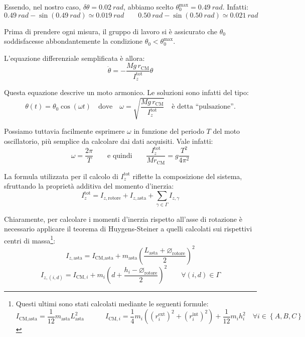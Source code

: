 \documentclass{article}
\newcommand*{\diam}{\varnothing}
\begin{document}
Essendo, nel nostro caso, $\delta\theta=\qty{0.02}{rad}$, abbiamo scelto
$\theta_0^\text{max} = \qty{0.49}{rad}$. Infatti:
\[
  \qty{0.49}{rad} - \sin(\qty{0.49}{rad}) \simeq \qty{0.019}{rad}
  \qquad
  \qty{0.50}{rad} - \sin(\qty{0.50}{rad}) \simeq \qty{0.021}{rad}
\]

Prima di prendere ogni misura, il gruppo di lavoro si è assicurato
che $\theta_0$ soddisfacesse abbondantemente la condizione
$\theta_0<\theta_0^\text{max}$.

L'equazione differenziale semplificata è allora:
\[ \ddot{\theta} = -\frac{Mg\,r_\text{CM}}{I_z^\text{tot}} \theta \]

Questa equazione descrive un moto armonico. Le soluzioni sono infatti
del tipo:
\[
  \theta(t) = \theta_0\cos(\omega t)
  \quad\text{dove}\quad
  \omega = \sqrt{\frac{Mg\,r_\text{CM}}{I_z^\text{tot}}}\quad\text{è detta “pulsazione”}.
\]

Possiamo tuttavia facilmente esprimere $\omega$ in funzione del periodo
$T$ del moto oscillatorio, più semplice da calcolare dai dati acquisiti.
Vale infatti:
\[
  \omega = \frac{2\pi}{T}
  \qquad\text{e quindi}\qquad
  \frac{I_z^\text{tot}}{Mr_\text{CM}} = g \frac{T^2}{4\pi^2}
\]

La formula utilizzata per il calcolo di $I_z^\text{tot}$ riflette la composizione
del sistema, sfruttando la proprietà additiva del momento d'inerzia:
\[I_z^\text{tot} = I_{z,\text{rotore}} + I_{z,\text{asta}} + \sum_{\gamma\in\Gamma} I_{z,\gamma}\]

Chiaramente, per calcolare i momenti d'inerzia rispetto all'asse di
rotazione è necessario applicare il teorema di Huygens-Steiner
a quelli calcolati sui rispettivi centri di massa\footnote{
  Questi ultimi sono stati calcolati mediante le seguenti formule:
  \[
    I_\text{CM,asta} = \frac{1}{12} m_\text{asta} L_\text{asta}^2
    \qquad\quad
    I_{\text{CM},i} =
      \frac{1}{4}m_i\left(
        (r_i^\text{ext})^2 + (r_i^\text{int})^2
      \right) + \frac{1}{12} m_i h_i^2
    \quad\forall i \in \left\{A,B,C\right\}
  \]
}:
\[
  I_{z,\text{asta}} = I_\text{CM,asta} + m_\text{asta}\left(\frac{L_\text{asta} + \diam_\text{rotore}}{2}\right)^2
\]\[
  I_{z,(i,d)} = I_{\text{CM},i} + m_i\left(d + \frac{h_i - \diam_\text{rotore}}{2}\right)^2\qquad\forall(i,d)\in\Gamma
\]
\end{document}
